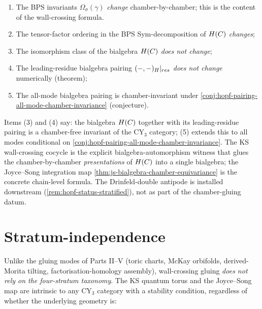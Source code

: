 \begin{enumerate}[leftmargin=2em]
  \item The BPS invariants $\Omega_\sigma(\gamma)$ \emph{change} chamber-by-chamber;
        this is the content of the wall-crossing formula.
  \item The tensor-factor ordering in the BPS Sym-decomposition of
        $H(C)$ \emph{changes};
  \item The isomorphism class of the bialgebra $H(C)$ \emph{does not change};
  \item The leading-residue bialgebra pairing $(-, -)_{H}|_{res}$
        \emph{does not change} numerically (theorem);
  \item The all-mode bialgebra pairing is chamber-invariant under
        \cref{conj:hopf-pairing-all-mode-chamber-invariance}
        (conjecture).
\end{enumerate}

Items (3) and (4) say: the bialgebra $H(C)$ together with its
leading-residue pairing is a chamber-free invariant of the CY$_3$
category; (5) extends this to all modes conditional on
\cref{conj:hopf-pairing-all-mode-chamber-invariance}.
The KS wall-crossing cocycle is the explicit bialgebra-automorphism witness
that glues the chamber-by-chamber \emph{presentations} of $H(C)$ into
a single bialgebra; the Joyce--Song integration map
\cref{thm:js-bialgebra-chamber-equivariance} is the concrete chain-level
formula. The Drinfeld-double antipode is installed downstream
(\cref{rem:hopf-status-stratified}), not as part of the chamber-gluing
datum.

\section{Stratum-independence}
\label{sec:wc-stratum-independence}

Unlike the gluing modes of Parts II--V (toric charts, McKay orbifolds,
derived-Morita tilting, factorisation-homology assembly), wall-crossing
gluing \emph{does not rely on the four-stratum taxonomy}. The KS quantum
torus and the Joyce--Song map are intrinsic to any CY$_3$ category with a
stability condition, regardless of whether the underlying geometry is:

